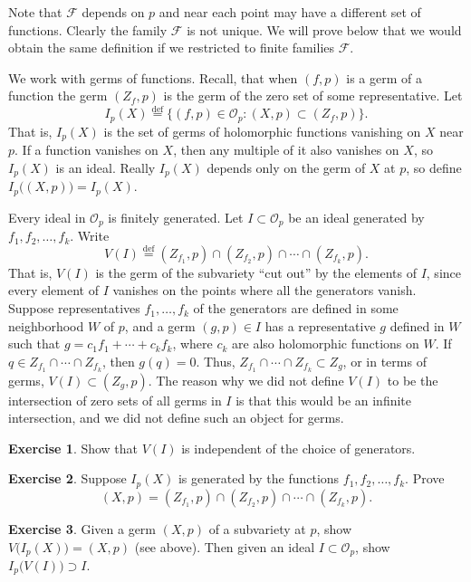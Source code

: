 \documentclass[12pt,openany]{book}
\newcommand{\sF}{{\mathscr{F}}}
\newcommand{\sO}{{\mathscr{O}}}
\theoremstyle{plain}
\theoremstyle{remark}
\theoremstyle{definition}
\newenvironment{exbox}{%
    \def\FrameCommand{\vrule width 1pt \relax\hspace{10pt}}%
    \MakeFramed{\advance\hsize-\width\FrameRestore}%
}{%
    \endMakeFramed
}
\theoremstyle{exercise}
\newtheorem{exercise}{Exercise}[section]
\theoremstyle{example}
\begin{document}
Note that $\sF$ depends on $p$ and near each point may have a different set of
functions.  Clearly the family $\sF$ is not unique.  We will prove below
that we would obtain the same definition if we restricted to finite
families $\sF$.

We work with germs of functions.  Recall, that when $(f,p)$ is a germ of a function
the germ $(Z_f,p)$ is the germ of the zero set of some representative.
Let
%
\begin{equation*}
I_p(X) \overset{\text{def}}{=}
\bigl\{ (f,p) \in \sO_p : (X,p) \subset (Z_f,p) \bigr\} .
\end{equation*}
That is, $I_p(X)$ is the set of germs of holomorphic functions vanishing on
$X$ near $p$.  If a function vanishes on $X$, then any multiple of it also
vanishes on $X$, so $I_p(X)$ is an ideal.  Really $I_p(X)$ depends only on
the germ of $X$ at $p$, so define $I_p\bigl((X,p)\bigr) = I_p(X)$.

Every ideal in $\sO_p$ is finitely generated.
Let $I \subset \sO_p$ be an ideal generated by $f_1,f_2,\ldots,f_k$.
Write
%
\begin{equation*}
V(I) \overset{\text{def}}{=}
(Z_{f_1},p) \cap (Z_{f_2},p) \cap \cdots \cap (Z_{f_k},p) .
\end{equation*}
That is, $V(I)$ is the germ of the subvariety ``cut out'' by the elements of $I$,
since every
element of $I$ vanishes on the points where all the generators vanish.
Suppose representatives $f_1,\ldots,f_k$ of the generators are defined
in some neighborhood $W$ of $p$,
and a germ $(g,p) \in I$ has a representative $g$ defined in $W$
such that $g = c_1 f_1 + \cdots + c_k f_k$, where $c_k$ are also holomorphic
functions on $W$.  If $q \in Z_{f_1} \cap \cdots \cap Z_{f_k}$,
then $g(q) = 0$.  Thus,
$Z_{f_1} \cap \cdots \cap Z_{f_k} \subset Z_g$, or in terms of germs,
$V(I) \subset (Z_g,p)$.  The reason why we did not define $V(I)$ to be the
intersection of zero sets of all germs in $I$ is that this would be an
infinite intersection, and we did not define such an object for germs.

\begin{exbox}
\begin{exercise}
Show that $V(I)$ is independent of the choice of generators.
\end{exercise}

\begin{exercise}
Suppose $I_p(X)$ is generated by the functions $f_1, f_2, \ldots, f_k$.
Prove
\begin{equation*}
(X,p) = (Z_{f_1},p) \cap (Z_{f_2},p) \cap \cdots \cap (Z_{f_k},p) .
\end{equation*}
\end{exercise}

\begin{exercise}
Given a germ $(X,p)$ of a subvariety at $p$, show
$V\bigl(I_p(X)\bigr) = (X,p)$ (see above).
Then given an ideal $I \subset \sO_p$, show
$I_p\bigl(V(I)\bigr) \supset I$.
\end{exercise}
\end{exbox}
\end{document}
